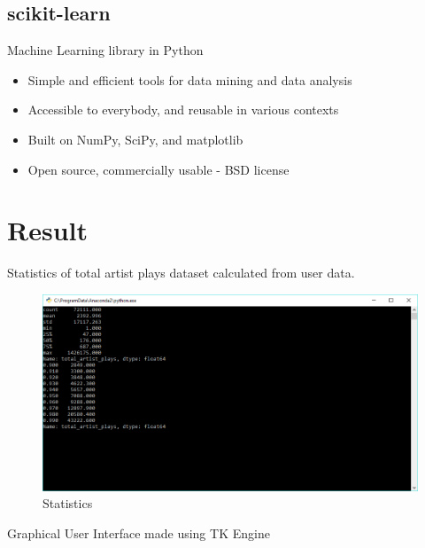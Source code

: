 \documentclass[paper=a4, fontsize=12pt]{scrartcl}
\numberwithin{equation}{section}		%
\numberwithin{figure}{section}			%
\numberwithin{table}{section}				%
\begin{document}
\subsection{scikit-learn}

Machine Learning library in Python
\begin{itemize}
	\item Simple and efficient tools for data mining and data analysis
	\item Accessible to everybody, and reusable in various contexts
	\item Built on NumPy, SciPy, and matplotlib
	\item Open source, commercially usable - BSD license
\end{itemize}


\section{Result}
Statistics of total artist plays dataset calculated from user data.
\begin{figure}[H]

\begin{center}

\includegraphics[scale=.6]{result1.png}

 \end{center}

  \caption{Statistics}

  \label{fig:}
\end{figure}  
Graphical User Interface made using TK Engine
\end{document}
